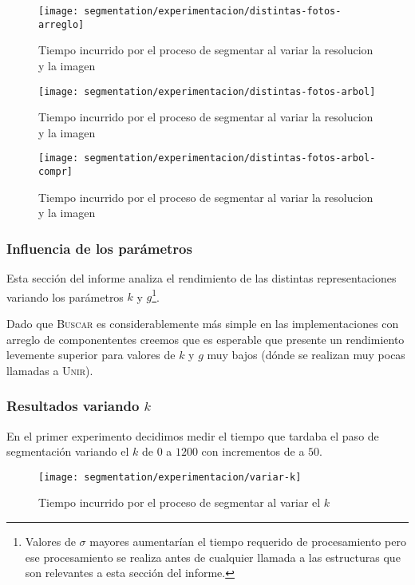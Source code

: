 \begin{figure}[h]
	\centering
	\texttt{[image: segmentation/experimentacion/distintas-fotos-arreglo]}
	\caption{Tiempo incurrido por el proceso de segmentar al variar la resolucion y la imagen}
\end{figure}

\begin{figure}[h]
	\centering
	\texttt{[image: segmentation/experimentacion/distintas-fotos-arbol]}
	\caption{Tiempo incurrido por el proceso de segmentar al variar la resolucion y la imagen}
\end{figure}

\begin{figure}[h]
	\centering
	\texttt{[image: segmentation/experimentacion/distintas-fotos-arbol-compr]}
	\caption{Tiempo incurrido por el proceso de segmentar al variar la resolucion y la imagen}
\end{figure}

\clearpage

\subsubsection{Influencia de los parámetros}

Esta sección del informe analiza el rendimiento de las distintas
representaciones variando los parámetros $k$ y $g$\footnote{Valores de $\sigma$
mayores aumentarían el tiempo requerido de procesamiento pero ese procesamiento
se realiza antes de cualquier llamada a las estructuras que son relevantes a
esta sección del informe.}.

Dado que \textsc{Buscar} es considerablemente más simple en las
implementaciones con arreglo de componententes creemos que es esperable que
presente un rendimiento levemente superior para valores de $k$ y $g$ muy bajos
(dónde se realizan muy pocas llamadas a \textsc{Unir}).

\subsubsection{Resultados variando $k$}

En el primer experimento decidimos medir el tiempo que tardaba el paso de
segmentación variando el $k$ de $0$ a $1200$ con incrementos de a $50$.

\begin{figure}[h]
	\centering
	\texttt{[image: segmentation/experimentacion/variar-k]}
	\caption{Tiempo incurrido por el proceso de segmentar al variar el $k$}
\end{figure}

